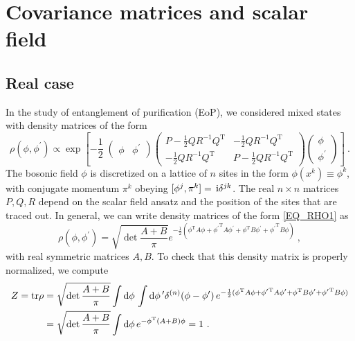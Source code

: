 \documentclass[letter]{article}
\newcommand{\intd}[1]{\int\mathrm{d}#1\,}
\begin{document}
\section{Covariance matrices and scalar field}
\subsection{Real case}

In the study of entanglement of purification (EoP), we considered mixed states with density matrices of the form
\begin{equation}
\label{EQ_RHO1}
\rho(\phi, \phi^\prime) \propto \exp\left[ 
-\frac{1}{2}\;
\begin{pmatrix}
\phi &
\phi^\prime
\end{pmatrix}
\begin{pmatrix}
P - \frac{1}{2}Q R^{-1} Q^\mathrm{T} & - \frac{1}{2}Q R^{-1} Q^\mathrm{T}\\
- \frac{1}{2}Q R^{-1} Q^\mathrm{T} & P - \frac{1}{2}Q R^{-1} Q^\mathrm{T}
\end{pmatrix}
\begin{pmatrix}
\phi \\
\phi^\prime
\end{pmatrix}
 \right]\ .
\end{equation}
The bosonic field $\phi$ is discretized on a lattice of $n$ sites in the form $\phi(x^k) \equiv \phi^k$, with conjugate momentum $\pi^k$ obeying $[\phi^j,\pi^k] = \,\mathrm{i}\delta^{j k}$. The real $n\times n$ matrices $P,Q,R$ depend on the scalar field ansatz and the position of the sites that are traced out.
In general, we can write density matrices of the form \eqref{EQ_RHO1} as
\begin{equation}
\label{EQ_RHO2}
\rho(\phi, \phi^\prime) = \sqrt{\det\frac{A+B}{\pi}} e^{-\frac{1}{2} (\phi^\mathrm{T} A \phi + {\phi^\prime}^\mathrm{T} A \phi^\prime + \phi^\mathrm{T} B \phi^\prime  + {\phi^\prime}^\mathrm{T} B \phi) }\ ,
\end{equation}
with real symmetric matrices $A,B$. To check that this density matrix is properly normalized, we compute
\begin{align}
Z = \tr{\rho} &=  \sqrt{\det\frac{A+B}{\pi}} \intd\phi \intd\phi^\prime  \delta^{(n)}(\phi - \phi^\prime)\, e^{ -\frac{1}{2} (\phi^\mathrm{T} A \phi + {\phi^\prime}^\mathrm{T} A \phi^\prime + \phi^\mathrm{T} B \phi^\prime + {\phi^\prime}^\mathrm{T} B \phi ) } \nonumber\\
&= \sqrt{\det\frac{A+B}{\pi}} \intd\phi e^{ -\phi^\mathrm{T} (A+B) \phi} 
= 1\ .
\end{align}
\end{document}
